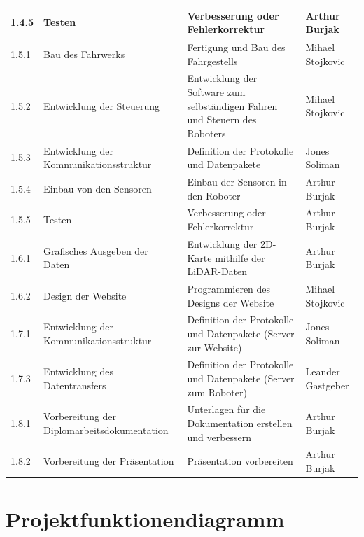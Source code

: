 \begin{longtable}[c]{|p{1cm}|p{5cm}|p{5cm}|l|}
\hline
1.4.5 & Testen & Verbesserung oder Fehlerkorrektur & Arthur Burjak \\
\hline
1.5.1 & Bau des Fahrwerks & Fertigung und Bau des Fahrgestells & Mihael Stojkovic \\
\hline
1.5.2 & Entwicklung der Steuerung & Entwicklung der Software zum selbständigen Fahren und Steuern des Roboters & Mihael Stojkovic \\
\hline
1.5.3 & Entwicklung der Kommunikationsstruktur & Definition der Protokolle und Datenpakete & Jones Soliman \\
\hline
1.5.4 & Einbau von den Sensoren & Einbau der Sensoren in den Roboter & Arthur Burjak \\
\hline
1.5.5 & Testen & Verbesserung oder Fehlerkorrektur & Arthur Burjak \\
\hline
1.6.1 & Grafisches Ausgeben der Daten & Entwicklung der 2D-Karte mithilfe der LiDAR-Daten & Arthur Burjak \\
\hline
1.6.2 & Design der Website & Programmieren des Designs der Website & Mihael Stojkovic \\
\hline
1.7.1 & Entwicklung der Kommunikationsstruktur & Definition der Protokolle und Datenpakete (Server zur Website) & Jones Soliman \\
\hline
1.7.3 & Entwicklung des Datentransfers & Definition der Protokolle und Datenpakete (Server zum Roboter) & Leander Gastgeber \\
\hline
1.8.1 & Vorbereitung der Diplomarbeitsdokumentation & Unterlagen für die Dokumentation erstellen und verbessern & Arthur Burjak \\
\hline
1.8.2 & Vorbereitung der Präsentation & Präsentation vorbereiten & Arthur Burjak \\
\hline
\end{longtable}


\newpage

\section{Projektfunktionendiagramm}

